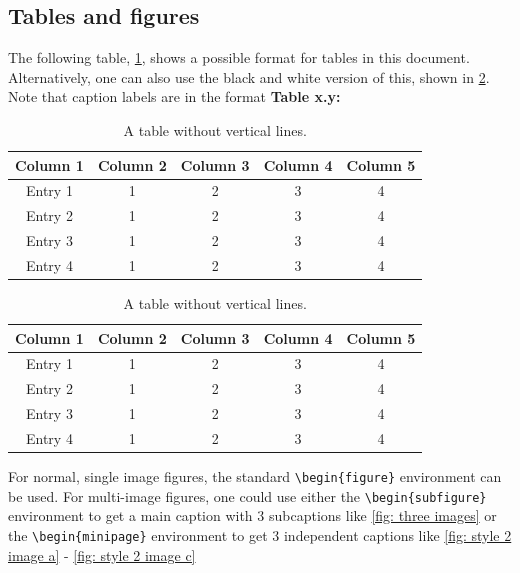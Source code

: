 \newpage

\subsection{Tables and figures}
The following table, \cref{table: style 1}, shows a possible format for tables in this document. Alternatively, one can also use the black and white version of this, shown in \cref{table: style 2}. Note that caption labels are in the format \textbf{\textcolor{Tue-red}{Table x.y:} }
\begin{table}[ht]
\centering
\caption{A table without vertical lines.}
\begin{tabular}[t]{ccccc}
\toprule
\color{Tue-red}\textbf{Column 1}&\color{Tue-red}\textbf{Column 2}&\color{Tue-red}\textbf{Column 3}&\color{Tue-red}\textbf{Column 4}&\color{Tue-red}\textbf{Column 5}\\
\midrule
Entry 1&1&2&3&4\\
Entry 2&1&2&3&4\\
Entry 3&1&2&3&4\\
Entry 4&1&2&3&4\\
\bottomrule
\end{tabular}
\label{table: style 1}
\end{table}

\begin{table}[ht]
\centering
\caption{A table without vertical lines.}
\begin{tabular}[t]{ccccc}
\toprule
\textbf{Column 1}&\textbf{Column 2}&\textbf{Column 3}&\textbf{Column 4}&\textbf{Column 5}\\
\midrule
Entry 1&1&2&3&4\\
Entry 2&1&2&3&4\\
Entry 3&1&2&3&4\\
Entry 4&1&2&3&4\\
\bottomrule
\end{tabular}
\label{table: style 2}
\end{table}

For normal, single image figures, the standard \texttt{\textbackslash begin\{figure\}} environment can be used. For multi-image figures, one could use either the \texttt{\textbackslash begin\{subfigure\}} environment to get a main caption with 3 subcaptions like \cref{fig: three images} or the \texttt{\textbackslash begin\{minipage\}} environment to get 3 independent captions like \cref{fig: style 2 image a} - \ref{fig: style 2 image c}

